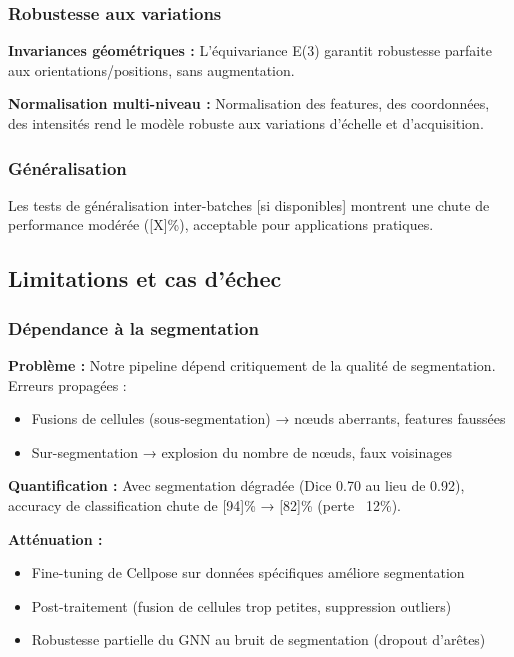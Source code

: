 \subsubsection{Robustesse aux variations}

\textbf{Invariances géométriques :}
L'équivariance E(3) garantit robustesse parfaite aux orientations/positions, sans augmentation.

\textbf{Normalisation multi-niveau :}
Normalisation des features, des coordonnées, des intensités rend le modèle robuste aux variations d'échelle et d'acquisition.

\subsubsection{Généralisation}

Les tests de généralisation inter-batches [si disponibles] montrent une chute de performance modérée ([X]\%), acceptable pour applications pratiques.

\subsection{Limitations et cas d'échec}

\subsubsection{Dépendance à la segmentation}

\textbf{Problème :}
Notre pipeline dépend critiquement de la qualité de segmentation. Erreurs propagées :
\begin{itemize}
    \item Fusions de cellules (sous-segmentation) → nœuds aberrants, features faussées
    \item Sur-segmentation → explosion du nombre de nœuds, faux voisinages
\end{itemize}

\textbf{Quantification :}
Avec segmentation dégradée (Dice 0.70 au lieu de 0.92), accuracy de classification chute de [94]\% → [82]\% (perte ~12\%).

\textbf{Atténuation :}
\begin{itemize}
    \item Fine-tuning de Cellpose sur données spécifiques améliore segmentation
    \item Post-traitement (fusion de cellules trop petites, suppression outliers)
    \item Robustesse partielle du GNN au bruit de segmentation (dropout d'arêtes)
\end{itemize}


